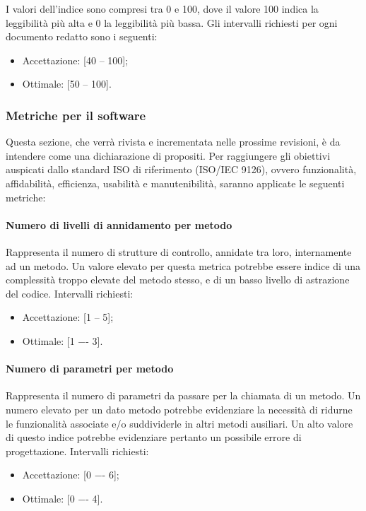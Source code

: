 I valori dell'indice sono compresi tra 0 e 100, dove il valore 100 indica la leggibilità più alta e 0 la leggibilità più bassa.
Gli intervalli richiesti per ogni documento redatto sono i seguenti:
\begin{itemize}
\item Accettazione: [40 -- 100];
\item Ottimale: [50 -- 100].
\end{itemize}

\subsubsection{Metriche per il software}

Questa sezione, che verrà rivista e incrementata nelle prossime revisioni, è da intendere come una dichiarazione di propositi.
Per raggiungere gli obiettivi auspicati dallo standard ISO di riferimento (ISO/IEC 9126), ovvero funzionalità, affidabilità,
efficienza, usabilità e manutenibilità, saranno applicate le seguenti metriche:

\paragraph{Numero di livelli di annidamento per metodo}
Rappresenta il numero di strutture di controllo, annidate tra loro, internamente ad un metodo.
Un valore elevato per questa metrica potrebbe essere indice di una complessità troppo elevate del metodo stesso, e di un basso livello di astrazione del codice.
Intervalli richiesti:
\begin{itemize}
\item
Accettazione: [1 -- 5];
\item
Ottimale: [1 −- 3].
\end{itemize}

\paragraph{Numero di parametri per metodo}
Rappresenta il numero di parametri da passare per la chiamata di un metodo.
Un numero elevato per un dato metodo potrebbe evidenziare la necessità di ridurne le funzionalità associate e/o suddividerle in altri metodi ausiliari.
Un alto valore di questo indice potrebbe evidenziare pertanto un possibile errore di progettazione.
Intervalli richiesti:
\begin{itemize}
\item
Accettazione: [0 −- 6];
\item
Ottimale: [0 −- 4].
\end{itemize}

